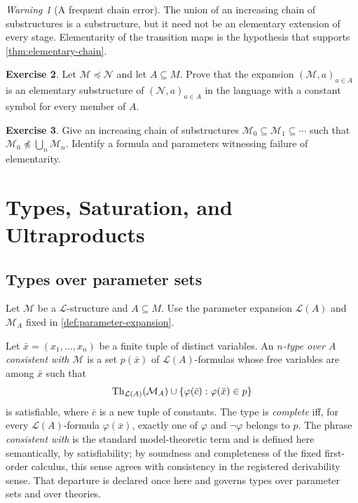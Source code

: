 \documentclass[11pt,oneside,openany]{book}
\theoremstyle{definition}
\newtheorem{definition}{Definition}[chapter]
\newtheorem{exercise}[definition]{Exercise}
\theoremstyle{plain}
\theoremstyle{remark}
\newtheorem{warning}[definition]{Warning}
\let\LogicDefinition\definition
\let\endLogicDefinition\enddefinition
\renewenvironment{definition}[1][]{%
  \LogicDefinition[#1]%
  \if\relax\detokenize{#1}\relax\else\index{#1}\fi
}{\endLogicDefinition}
\DeclarePairedDelimiter{\set}{\lbrace}{\rbrace}
\newcommand{\Lang}{\mathcal{L}}
\newcommand{\Th}{\operatorname{Th}}
\begin{document}
\begin{warning}[A frequent chain error]
The union of an increasing chain of substructures is a substructure, but it
need not be an elementary extension of every stage.  Elementarity of the
transition maps is the hypothesis that supports
\cref{thm:elementary-chain}.
\end{warning}

\begin{exercise}
\label{ex:maps-elementarity-02}
Let \(\mathcal M\preccurlyeq\mathcal N\) and let \(A\subseteq M\).  Prove that
the expansion \((\mathcal M,a)_{a\in A}\) is an elementary substructure of
\((\mathcal N,a)_{a\in A}\) in the language with a constant symbol for every
member of \(A\).
\end{exercise}

\begin{exercise}
\label{ex:maps-elementarity-03}
Give an increasing chain of substructures
\(\mathcal M_0\subseteq\mathcal M_1\subseteq\cdots\) such that
\(\mathcal M_0\not\preccurlyeq\bigcup_n\mathcal M_n\).  Identify a formula
and parameters witnessing failure of elementarity.
\end{exercise}

\chapter{Types, Saturation, and Ultraproducts}
\label{ch:types-ultraproducts}

\section{Types over parameter sets}
\label{sec:types-ultraproducts-01}

Let \(\mathcal M\) be a \(\Lang\)-structure and \(A\subseteq M\).  Use the
parameter expansion \(\Lang(A)\) and \(\mathcal M_A\) fixed in
\cref{def:parameter-expansion}.

\begin{definition}[Type]
Let \(\bar x=(x_1,\ldots,x_n)\) be a finite tuple of distinct variables.  An
\emph{\(n\)-type over \(A\) consistent with \(\mathcal M\)} is a set
\(p(\bar x)\) of \(\Lang(A)\)-formulas whose free variables are among
\(\bar x\) such that
\[
  \Th_{\Lang(A)}(\mathcal M_A)\cup
  \set{\varphi(\bar c):\varphi(\bar x)\in p}
\]
is satisfiable, where \(\bar c\) is a new tuple of constants.  The type is
\emph{complete} iff, for every \(\Lang(A)\)-formula \(\varphi(\bar x)\),
exactly one of \(\varphi\) and \(\neg\varphi\) belongs to \(p\).  The
phrase \emph{consistent with} is the standard model-theoretic term and is
defined here semantically, by satisfiability; by soundness and completeness
of the fixed first-order calculus, this sense agrees with consistency in
the registered derivability sense.  That departure is declared once here
and governs types over parameter sets and over theories.
\end{definition}
\end{document}
